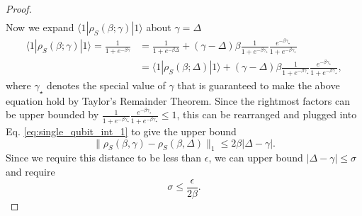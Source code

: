 \documentclass{article}
\newcommand{\ket}[1]{|#1\rangle}
\newcommand{\bra}[1]{\langle #1|}
\newcommand{\norm}[1]{\| #1 \|}
\begin{document}
\begin{proof}
\begin{align}
 \end{align}
    Now we expand $\bra{1} \rho_S(\beta; \gamma) \ket{1}$ about $\gamma = \Delta$
    \begin{align}
    \bra{1} \rho_S(\beta; \gamma) \ket{1} = \frac{1}{1 + e^{-\beta \gamma}} &= \frac{1}{1 + e^{-\beta \Delta}} + (\gamma - \Delta) \beta \frac{1}{1 + e^{-\beta \gamma_{\star}}} \frac{e^{-\beta \gamma_{\star}}}{1 + e^{-\beta \gamma_{\star}}} \\
    &= \bra{1} \rho_S(\beta; \Delta) \ket{1} + (\gamma - \Delta) \beta \frac{1}{1 + e^{-\beta \gamma_{\star}}} \frac{e^{-\beta \gamma_{\star}}}{1 + e^{-\beta \gamma_{\star}}},
    \end{align}
    where $\gamma_{\star}$ denotes the special value of $\gamma$ that is guaranteed to make the above equation hold by Taylor's Remainder Theorem.
    Since the rightmost factors can be upper bounded by $\frac{1}{1 + e^{-\beta \gamma_{\star}}} \frac{e^{-\beta \gamma_{\star}}}{1 + e^{-\beta \gamma_{\star}}} \le 1$, this can be rearranged and plugged into Eq. \eqref{eq:single_qubit_int_1} to give the upper bound
 \begin{equation}
 \norm{\rho_S(\beta, \gamma) - \rho_S(\beta, \Delta)}_1 \le 2 \beta |\Delta - \gamma|.
 \end{equation}
Since we require this distance to be less than $\epsilon$, we can upper bound $|\Delta - \gamma| \le \sigma$ and require
\begin{equation}
    \sigma \le \frac{\epsilon}{2 \beta}. \label{eq:single_qubit_ineq_1}
\end{equation}


\end{proof}
\end{document}
